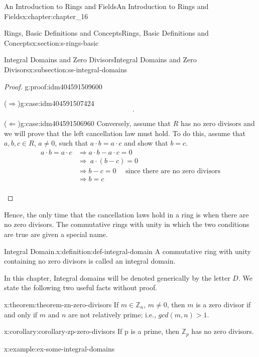 \documentclass[twoside,10pt,]{book}
\newcommand{\forwardimplication}{($\Rightarrow$)}
\newcommand{\backwardimplication}{($\Leftarrow$)}
\numberwithin{equation}{section}
\newcommand{\gt}{>}
\begin{document}
\begin{chapterptx}{An Introduction to Rings and Fields}{}{An Introduction to Rings and Fields}{}{}{x:chapter:chapter_16}
\begin{sectionptx}{Rings, Basic Definitions and Concepts}{}{Rings, Basic Definitions and Concepts}{}{}{x:section:s-rings-basic}
\begin{subsectionptx}{Integral Domains and Zero Divisors}{}{Integral Domains and Zero Divisors}{}{}{x:subsection:ss-integral-domains}
\begin{proof}{}{g:proof:idm404591509600}
\begin{case}{\forwardimplication}{}{g:case:idm404591507424}
\begin{equation*}
\begin{split}
\end{split}\text{.}
\end{equation*}
%
\end{case}
\begin{case}{\backwardimplication}{}{g:case:idm404591506960}
Conversely, assume that \(R\) has no zero divisors and we will prove that the left cancellation law must hold. To do this, assume that \(a,b, c \in  R\), \(a \neq  0\), such that \(a \cdot  b = a \cdot  c\) and show that \(b = c\).%
\begin{equation*}
\begin{split}
a \cdot  b = a \cdot  c & \Rightarrow  a \cdot  b - a \cdot  c=0\\
&\Rightarrow\ a\cdot (b-c) =0\\
& \Rightarrow  b-c = 0\quad \textrm{   since there are no zero divisors}\\
&\Rightarrow b=c\\
\end{split}
\end{equation*}
%
\par
%
\end{case}
\end{proof}
Hence, the only time that the cancellation laws hold in a ring is when there are no zero divisors. The commutative rings with unity in which the two conditions are true are given a special name.%
\begin{definition}{Integral Domain.}{x:definition:def-integral-domain}%
%
\label{g:notation:idm404591497312}%
A commutative ring with unity containing no zero divisors is called an integral domain.%
\end{definition}
In this chapter, Integral domains will be denoted generically by the letter \(D\). We state the following two useful facts without proof.%
\begin{theorem}{}{}{x:theorem:theorem-zn-zero-divisors}%
If \(m \in \mathbb{Z}_n\), \(m\neq 0\), then \(m\) is a zero divisor if and only if \(m\) and \(n\) are not relatively prime; i.e., \(gcd(m, n) \gt  1\).%
\end{theorem}
\begin{corollary}{}{}{x:corollary:corollary-zp-zero-divisors}%
If p is a prime, then \(\mathbb{Z}_p\) has no zero divisors.%
\end{corollary}
\begin{example}{}{x:example:ex-some-integral-domains}%

\end{example}
\end{subsectionptx}
\end{sectionptx}
\end{chapterptx}
\end{document}
